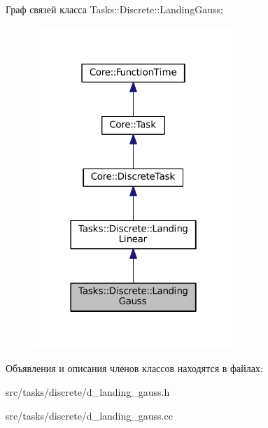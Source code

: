 Граф связей класса Tasks\+:\+:Discrete\+:\+:Landing\+Gauss\+:\nopagebreak
\begin{figure}[H]
\begin{center}
\leavevmode
\includegraphics[width=214pt]{class_tasks_1_1_discrete_1_1_landing_gauss__coll__graph}
\end{center}
\end{figure}


Объявления и описания членов классов находятся в файлах\+:\begin{DoxyCompactItemize}
\item 
src/tasks/discrete/d\+\_\+landing\+\_\+gauss.\+h\item 
src/tasks/discrete/d\+\_\+landing\+\_\+gauss.\+cc\end{DoxyCompactItemize}
